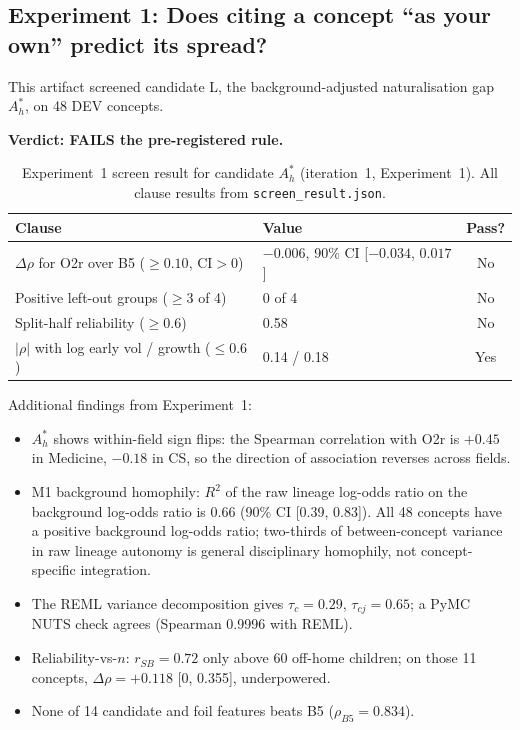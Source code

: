 \documentclass[11pt,letterpaper]{article}
\begin{document}
\subsection{Experiment 1: Does citing a concept ``as your own'' predict its spread?}

This artifact screened candidate L, the background-adjusted naturalisation gap $A^*_h$, on 48 DEV concepts.

\textbf{Verdict: FAILS the pre-registered rule.}

\begin{table}[!htbp]
\centering
\caption{Experiment~1 screen result for candidate $A^*_h$ (iteration~1, Experiment~1). All clause results from \texttt{screen\_result.json}.}
\label{tab:exp1_screen}
\small
\begin{tabular}{p{6cm}p{5cm}c}
\toprule
Clause & Value & Pass? \\
\midrule
$\Delta\rho$ for O2r over B5 ($\geq 0.10$, CI$>$0) & $-0.006$, 90\% CI [$-0.034$, $0.017$] & No \\
Positive left-out groups ($\geq 3$ of 4) & 0 of 4 & No \\
Split-half reliability ($\geq 0.6$) & 0.58 & No \\
$|\rho|$ with log early vol / growth ($\leq 0.6$) & 0.14 / 0.18 & Yes \\
\bottomrule
\end{tabular}
\end{table}

Additional findings from Experiment~1:
\begin{itemize}
    \item $A^*_h$ shows within-field sign flips: the Spearman correlation with O2r is $+0.45$ in Medicine, $-0.18$ in CS, so the direction of association reverses across fields.
    \item M1 background homophily: $R^2$ of the raw lineage log-odds ratio on the background log-odds ratio is 0.66 (90\% CI [0.39, 0.83]). All 48 concepts have a positive background log-odds ratio; two-thirds of between-concept variance in raw lineage autonomy is general disciplinary homophily, not concept-specific integration.
    \item The REML variance decomposition gives $\tau_c = 0.29$, $\tau_{cj} = 0.65$; a PyMC NUTS check agrees (Spearman 0.9996 with REML).
    \item Reliability-vs-$n$: $r_{SB} = 0.72$ only above 60 off-home children; on those 11 concepts, $\Delta\rho = +0.118$ [0, 0.355], underpowered.
    \item None of 14 candidate and foil features beats B5 ($\rho_{B5} = 0.834$).
\end{itemize}
\end{document}
